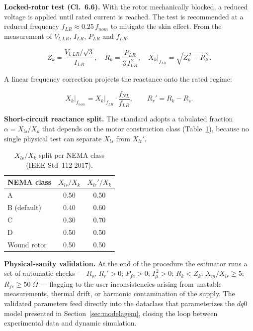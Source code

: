 \textbf{Locked-rotor test (Cl.~6.6).} With the rotor mechanically blocked, a reduced voltage is applied until rated current is reached. The test is recommended at a reduced frequency $f_{LR} \approx 0.25\,f_{nom}$ to mitigate the skin effect. From the measurement of $V_{l,LR}$, $I_{LR}$, $P_{LR}$ and $f_{LR}$:

\begin{equation}
\label{eq:ieee_zk_en}
Z_k = \frac{V_{l,LR}/\sqrt{3}}{I_{LR}}, \quad R_k = \frac{P_{LR}}{3\,I_{LR}^{\,2}}, \quad X_k\big|_{f_{LR}} = \sqrt{Z_k^{\,2} - R_k^{\,2}}.
\end{equation}

\noindent A linear frequency correction projects the reactance onto the rated regime:

\begin{equation}
\label{eq:ieee_xk_corr_en}
X_k\big|_{f_{nom}} = X_k\big|_{f_{LR}} \cdot \frac{f_{NL}}{f_{LR}}, \qquad R_r' = R_k - R_s.
\end{equation}

\textbf{Short-circuit reactance split.} The standard adopts a tabulated fraction $\alpha = X_{ls}/X_k$ that depends on the motor construction class (Table~\ref{tab:nema_split_en}), because no single physical test can separate $X_{ls}$ from $X_{lr}'$.

\begin{table}[htbp]
\centering
\caption{$X_{ls}/X_k$ split per NEMA class (IEEE Std~112-2017).}
\label{tab:nema_split_en}
\begin{tabular}{lcc}
\hline
\textbf{NEMA class} & $X_{ls}/X_k$ & $X_{lr}'/X_k$ \\ \hline
A & 0.50 & 0.50 \\
B (default) & 0.40 & 0.60 \\
C & 0.30 & 0.70 \\
D & 0.50 & 0.50 \\
Wound rotor & 0.50 & 0.50 \\ \hline
\end{tabular}
\end{table}

\textbf{Physical-sanity validation.} At the end of the procedure the estimator runs a set of automatic checks — $R_s,\,R_r' > 0$; $P_{fe} > 0$; $I_\mu^{\,2} > 0$; $R_k < Z_k$; $X_m/X_{ls} \geq 5$; $R_{fe} \geq 50\;\Omega$ — flagging to the user inconsistencies arising from unstable measurements, thermal drift, or harmonic contamination of the supply. The validated parameters feed directly into the dataclass that parameterizes the $dq0$ model presented in Section~\ref{sec:modelagem}, closing the loop between experimental data and dynamic simulation.

